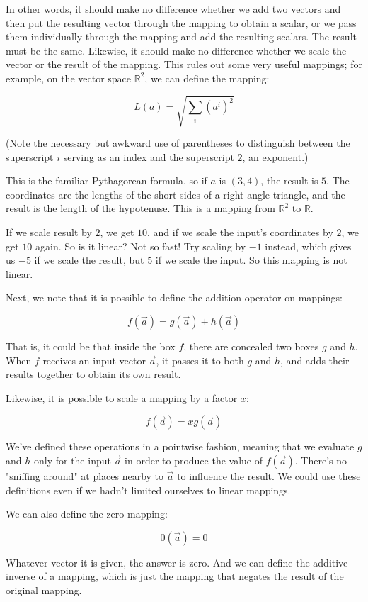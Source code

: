 In other words, it should make no difference whether we add two vectors and then put the resulting vector through the mapping to obtain a scalar, or we pass them individually through the mapping and add the resulting scalars. The result must be the same. Likewise, it should make no difference whether we scale the vector or the result of the mapping. This rules out some very useful mappings; for example, on the vector space $\mathbb{R}^2$, we can define the mapping:

$$
L(a) = \sqrt{ \sum_i (a^i)^2 }
$$

(Note the necessary but awkward use of parentheses to distinguish between the superscript $i$ serving as an index and the superscript $2$, an exponent.)

This is the familiar Pythagorean formula, so if $a$ is $(3, 4)$, the result is $5$. The coordinates are the lengths of the short sides of a right-angle triangle, and the result is the length of the hypotenuse. This is a mapping from $\mathbb{R}^2$ to $\mathbb{R}$.

If we scale result by $2$, we get $10$, and if we scale the input's coordinates by $2$, we get $10$ again. So is it linear? Not so fast! Try scaling by $-1$ instead, which gives us $-5$ if we scale the result, but $5$ if we scale the input. So this mapping is not linear. 

Next, we note that it is possible to define the addition operator on mappings:

$$
f(\vec{a}) = g(\vec{a}) + h(\vec{a})
$$

That is, it could be that inside the box $f$, there are concealed two boxes $g$ and $h$. When $f$ receives an input vector $\vec{a}$, it passes it to both $g$ and $h$, and adds their results together to obtain its own result.

Likewise, it is possible to scale a mapping by a factor $x$:

$$
f(\vec{a}) = x g(\vec{a})
$$

We've defined these operations in a pointwise fashion, meaning that we evaluate $g$ and $h$ only for the input $\vec{a}$ in order to produce the value of $f(\vec{a})$. There's no "sniffing around" at places nearby to $\vec{a}$ to influence the result. We could use these definitions even if we hadn't limited ourselves to linear mappings.

We can also define the zero mapping:

$$
0(\vec{a}) = 0
$$

Whatever vector it is given, the answer is zero. And we can define the additive inverse of a mapping, which is just the mapping that negates the result of the original mapping.

